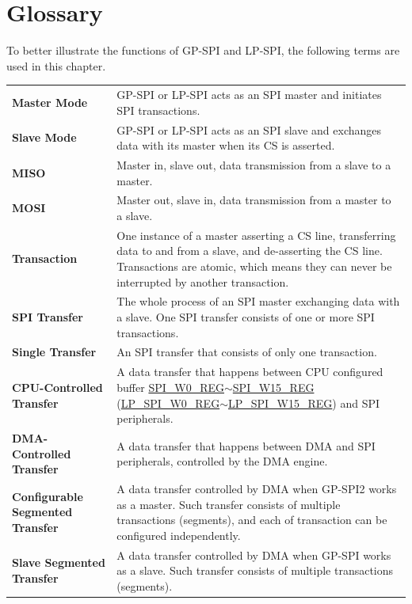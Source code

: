 \section{Glossary}

To better illustrate the functions of GP-SPI and LP-SPI, the following terms are used in this chapter. 

\begin{longtable}[c]{ R{7cm} p{10cm} }

\textbf{Master Mode}     & GP-SPI or LP-SPI acts as an SPI master and initiates SPI transactions. \\ 
\textbf{Slave Mode}      & GP-SPI or LP-SPI acts as an SPI slave and exchanges data with its master when its CS is asserted.\\
\textbf{MISO}       & Master in, slave out, data transmission from a slave to a master.\\
\textbf{MOSI}  & Master out, slave in, data transmission from a master to a slave. \\ 
\textbf{Transaction} & One instance of a master asserting a CS line, transferring data to and from a slave, and de-asserting the CS line. Transactions are atomic, which means they can never be interrupted by another transaction.\\
\textbf{SPI Transfer} & The whole process of an SPI master exchanging data with a slave. One SPI transfer consists of one or more SPI transactions.\\
\textbf{Single Transfer} & An SPI transfer that consists of only one transaction. \\
\textbf{CPU-Controlled Transfer}& A data transfer that happens between CPU configured buffer \hyperref[regdesc:SPIW0REG]{SPI\_W0\_REG}$\sim$\hyperref[regdesc:SPIW15REG]{SPI\_W15\_REG} (\hyperref[regdesc:LPSPIW0REG]{LP\_SPI\_W0\_REG}$\sim$\hyperref[regdesc:LPSPIW15REG]{LP\_SPI\_W15\_REG}) and SPI peripherals.\\
\textbf{DMA-Controlled Transfer}& A data transfer that happens between DMA and SPI peripherals, controlled by the DMA engine.\\
\textbf{Configurable Segmented Transfer}& A data transfer controlled by DMA when GP-SPI2 works as a master. Such transfer consists of multiple transactions (segments), and each of transaction can be configured independently.\\
\textbf{Slave Segmented Transfer} & A data transfer controlled by DMA when GP-SPI works as a slave. Such transfer consists of multiple transactions (segments).\\

\end{longtable}
